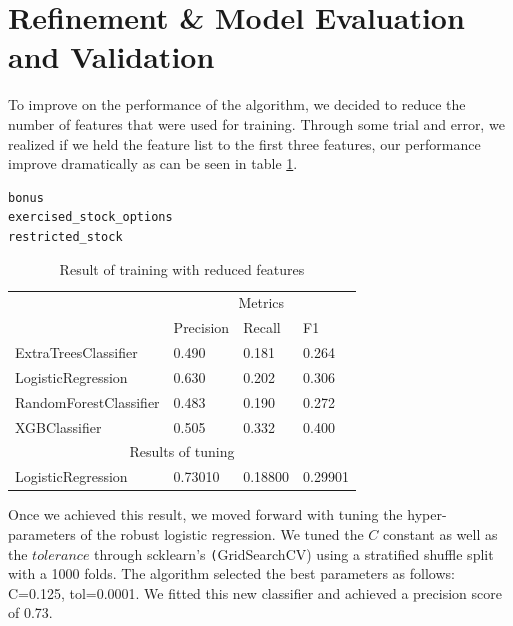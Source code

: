 \documentclass[twoside,openright,titlepage,numbers=noenddot,headinclude,%
               footinclude=true,cleardoublepage=empty,abstractoff,BCOR=5mm,%
               paper=a4,fontsize=11pt,ngerman,american]{scrreprt}
\numberwithin{theorem}{chapter}
\numberwithin{definition}{chapter}
\numberwithin{algorithm}{chapter}
\numberwithin{figure}{chapter}
\numberwithin{table}{chapter}
\numberwithin{equation}{chapter}
\begin{document}
\section*{Refinement \& Model Evaluation and Validation}
To improve on the performance of the algorithm, we decided to reduce the number of features that were used for training. Through some trial and error, we realized if we held the feature list to the first three features, our performance improve dramatically as can be seen in table \ref{reducedFeaturesTable}.
\begin{verbatim}
bonus
exercised_stock_options
restricted_stock 
\end{verbatim}

\setlength{\extrarowheight}{1.5pt}
\begin{table}[!htbp]
\caption{Result of training with reduced features} %
\centering %
\begin{tabular}{|p{6cm}|p{1.5cm}|p{1.5cm}|p{1.5cm}|} %
\hline %
& \multicolumn{3}{c|}{Metrics}\\[5pt]
\cline{2-4} 
& Precision & Recall & F1\\[0.5ex]
\hline %

ExtraTreesClassifier     &  0.490       &  0.181     &  0.264     \\ 
LogisticRegression       &  0.630       &  0.202     &  0.306     \\ 
RandomForestClassifier   &  0.483       &  0.190     &  0.272     \\ 
XGBClassifier            &  0.505       &  0.332     &  0.400     \\ 
\hline%
\multicolumn{4}{|c|}{Results of tuning}\\[5pt]
\hline

LogisticRegression          &  0.73010  &0.18800  &0.29901\\ 
\hline
\end{tabular}
\label{reducedFeaturesTable}
\end{table}

Once we achieved this result, we moved forward with tuning the hyper-parameters of the robust logistic regression. We tuned the $C$ constant as well as the $tolerance$ through scklearn's \texttt(GridSearchCV) using a stratified shuffle split with a 1000 folds. The algorithm selected the best parameters as follows: C=0.125, tol=0.0001. We fitted this new classifier and achieved a precision score of 0.73.
\end{document}
